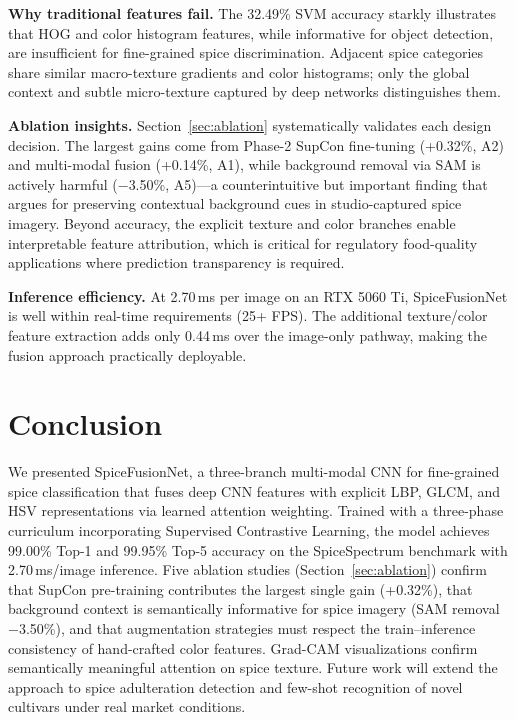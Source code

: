 \documentclass[conference]{IEEEtran}
\begin{document}
\textbf{Why traditional features fail.} The 32.49\% SVM accuracy starkly
illustrates that HOG and color histogram features, while informative for object
detection, are insufficient for fine-grained spice discrimination. Adjacent spice
categories share similar macro-texture gradients and color histograms; only the
global context and subtle micro-texture captured by deep networks distinguishes them.

\textbf{Ablation insights.} Section~\ref{sec:ablation} systematically validates each
design decision. The largest gains come from Phase-2 SupCon fine-tuning (+0.32\%,
A2) and multi-modal fusion (+0.14\%, A1), while background removal via SAM is
actively harmful ($-$3.50\%, A5)—a counterintuitive but important finding that
argues for preserving contextual background cues in studio-captured spice imagery.
Beyond accuracy, the explicit texture and color branches enable interpretable feature
attribution, which is critical for regulatory food-quality applications where
prediction transparency is required.

\textbf{Inference efficiency.} At 2.70\,ms per image on an RTX 5060 Ti, SpiceFusionNet
is well within real-time requirements (25+ FPS). The additional texture/color
feature extraction adds only 0.44\,ms over the image-only pathway, making the
fusion approach practically deployable.


\section{Conclusion}
\label{sec:conclusion}

We presented SpiceFusionNet, a three-branch multi-modal CNN for fine-grained spice
classification that fuses deep CNN features with explicit LBP, GLCM, and HSV
representations via learned attention weighting. Trained with a three-phase
curriculum incorporating Supervised Contrastive Learning, the model achieves
99.00\% Top-1 and 99.95\% Top-5 accuracy on the SpiceSpectrum benchmark with
2.70\,ms/image inference. Five ablation studies (Section~\ref{sec:ablation})
confirm that SupCon pre-training contributes the largest single gain (+0.32\%),
that background context is semantically informative for spice imagery (SAM removal
$-$3.50\%), and that augmentation strategies must respect the train–inference
consistency of hand-crafted color features. Grad-CAM visualizations confirm
semantically meaningful attention on spice texture. Future work will extend
the approach to spice adulteration detection and few-shot recognition of novel
cultivars under real market conditions.
\end{document}
